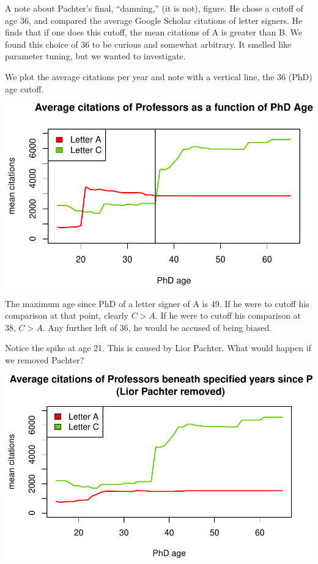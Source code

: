 \documentclass[]{article}
\begin{document}
A note about Pachter's final, ``damning,'' (it is not), figure. He chose
a cutoff of age 36, and compared the average Google Scholar citations of
letter signers. He finds that if one does this cutoff, the mean
citations of A is greater than B. We found this choice of 36 to be
curious and somewhat arbitrary. It smelled like parameter tuning, but we
wanted to investigate.

We plot the average citations per year and note with a vertical line,
the 36 (PhD) age cutoff.

\includegraphics{Response_files/figure-latex/unnamed-chunk-42-1.pdf}

The maximum age since PhD of a letter signer of A is 49. If he were to
cutoff his comparison at that point, clearly \(C>A\). If he were to
cutoff his comparison at 38, \(C>A\). Any further left of 36, he would
be accused of being biased.

Notice the spike at age 21. This is caused by Lior Pachter. What would
happen if we removed Pachter?

\includegraphics{Response_files/figure-latex/unnamed-chunk-44-1.pdf}
\end{document}
